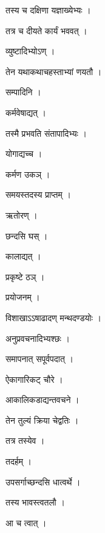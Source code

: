\documentclass[10pt, openany]{book}
\begin{document}
\noindent तस्य च दक्षिणा यज्ञाख्येभ्यः ।

\noindent तत्र च दीयते कार्यं भववत् ।

\noindent व्युष्टादिभ्योऽण् ।

\noindent तेन यथाकथाचहस्ताभ्यां णयतौ ।

\noindent सम्पादिनि ।

\noindent कर्मवेषाद्यत् ।

\noindent तस्मै प्रभवति संतापादिभ्यः ।

\noindent योगाद्यच्च ।

\noindent कर्मण उकञ् ।

\noindent समयस्तदस्य प्राप्तम् ।

\noindent ऋतोरण् ।

\noindent छन्दसि घस् ।

\noindent कालाद्यत् ।

\noindent प्रकृष्टे ठञ् ।

\noindent प्रयोजनम् ।

\noindent विशाखाऽऽषाढादण् मन्थदण्डयोः ।

\noindent अनुप्रवचनादिभ्यश्छः ।

\noindent समापनात् सपूर्वपदात् ।

\noindent ऐकागारिकट् चौरे ।

\noindent आकालिकडाद्यन्तवचने ।

\noindent तेन तुल्यं क्रिया चेद्वतिः ।

\noindent तत्र तस्येव ।

\noindent तदर्हम् ।

\noindent उपसर्गाच्छन्दसि धात्वर्थे ।

\noindent तस्य भावस्त्वतलौ ।

\noindent आ च त्वात् ।
\end{document}
